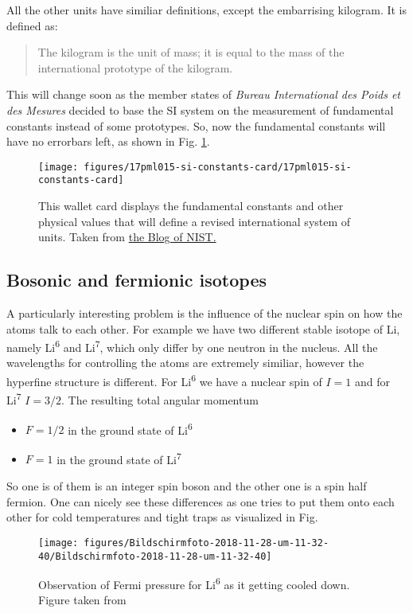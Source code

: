 \documentclass[10pt]{article}
\let\cite\citep
\providecommand\citep{\cite}
\begin{document}
All the other units have similiar definitions, except the embarrising kilogram. It is defined as:
\begin{quote}
The kilogram is the unit of mass; it is equal to the mass of the international prototype of the kilogram.
\end{quote}
This will change soon as the member states of \textit{Bureau International des Poids et des Mesures} decided to base the SI system on the measurement of fundamental constants instead of some prototypes. So, now the fundamental constants will have no errorbars left, as shown in Fig. \ref{134930}.
\begin{figure}[h!]
\begin{center}
\texttt{[image: figures/17pml015-si-constants-card/17pml015-si-constants-card]}
\caption{{This wallet card displays the fundamental constants and other physical
values that will define a revised international system of units. Taken
from
\href{http://https://www.nist.gov/si-redefinition/turning-point-humanity-redefining-worlds-measurement-system}{the
Blog of NIST.}
{\label{134930}}%
}}
\end{center}
\end{figure}

\subsection{Bosonic and fermionic isotopes}
A particularly interesting problem is the influence of the nuclear spin on how the atoms talk to each other. For example we have two different stable isotope of Li, namely Li\textsuperscript{6} and Li\textsuperscript{7}, which only differ by one neutron in the nucleus. All the wavelengths for controlling the atoms are extremely similiar, however the hyperfine structure is different. For Li\textsuperscript{6} we have a nuclear spin of $I=1$ and for Li\textsuperscript{7} $I=3/2$. The resulting total angular momentum 
\begin{itemize}
\item $F=1/2$ in the ground state of Li\textsuperscript{6}
\item $F=1$ in the ground state of Li\textsuperscript{7}
\end{itemize}
So one is of them is an integer spin boson and the other one is a spin half fermion. One can nicely see these differences as one tries to put them onto each other for cold temperatures and tight traps as visualized in Fig.
\begin{figure}[h!]
\begin{center}
\texttt{[image: figures/Bildschirmfoto-2018-11-28-um-11-32-40/Bildschirmfoto-2018-11-28-um-11-32-40]}
\caption{{Observation of Fermi pressure for Li\textsuperscript{6} as it getting
cooled down. Figure taken from \protect\cite{Truscott_2001}
{\label{280523}}%
}}
\end{center}
\end{figure}

\FloatBarrier
\nocite{*}



\end{document}
